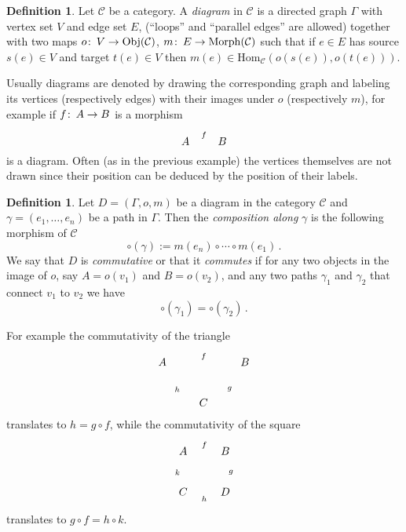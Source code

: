 \documentclass[12pt]{article}
\theoremstyle{definition}
\newtheorem{defn}[thm]{Definition}
\theoremstyle{remark}
\numberwithin{equation}{subsection}
\newcommand{\CC}{\mathcal{C}}
\newcommand{\Gg}{\gamma}
\newcommand{\GG}{\Gamma}
\def\co{\colon\thinspace}
\begin{document}
\begin{defn}
Let $\mathcal{C}$ be a category. A \emph{diagram} in $\CC$ is a
directed graph $\GG$ with vertex set $V$ and  edge set $E$, (``loops''
and ``parallel edges'' are allowed) together with two maps 
$o\co V\to\mathrm{Obj}(\CC)$, $m\co E\to \mathrm{Morph}(\CC)$ such that
if $e\in E$ has source $s(e)\in V$ and target $t(e)\in V$ then 
$m(e) \in \text{Hom}_{\CC}\left(o\left(s(e)\right),o\left(t(e)\right)\right)$.
\end{defn}

Usually diagrams are denoted by drawing the corresponding graph
and labeling its vertices (respectively edges) with their images under $o$
(respectively $m$), for example if $f\co A\to B$ is a morphism
$$\xymatrix@1{ {A}\ar[r]^f&{B} }$$
is a diagram. Often (as in the previous example) the vertices themselves are
not drawn since their position can be deduced by the position of their
labels.

\begin{defn}
  Let $D=(\GG,o,m)$ be a diagram in the category $\CC$ and $\Gg=(e_1,\ldots,e_n)$
be a path in $\GG$. Then the \emph{composition along} $\Gg$ is the following
morphism of $\CC$
$$\circ(\Gg):=m(e_n)\circ\cdots\circ m(e_1)\,.$$  
 We say that $D$ is
  \emph{commutative} or that it \emph{commutes} if for any two objects in
  the image of $o$, say $A=o(v_1)$ and $B=o(v_2)$, and any two paths $\Gg_1$
 and $\Gg_2$ that connect $v_1$ to $v_2$ we have
$$\circ(\Gg_1)=\circ(\Gg_2)\,.$$ 
\end{defn}

For example the commutativity of the triangle
$$\xymatrix{
{A}\ar[rr]^{f}\ar[dr]_{h}&&{B}\ar[dl]^{g}\\
&{C}&
}
$$ 
translates to $h=g\circ f$, while the commutativity of the square
$$\xymatrix{
{A}\ar[r]^{f}\ar[d]_{k}&{B}\ar[d]^{g}\\
{C}\ar[r]_{h}&{D}
}
$$
translates to $g\circ f=h\circ k$.
\end{document}
